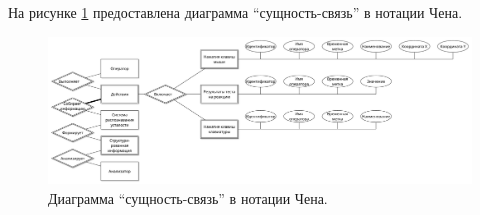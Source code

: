 На рисунке \ref{fig:erDiag} предоставлена диаграмма ``сущность-связь'' в нотации Чена.

\begin{figure}[H]
	\centering
	\includegraphics[width=\textwidth]{img/chenERDiagram.pdf}
	\caption{Диаграмма ``сущность-связь'' в нотации Чена.}
	\label{fig:erDiag}
\end{figure}

